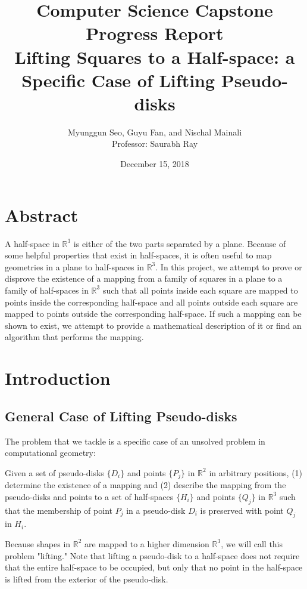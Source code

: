 \documentclass{NSF}
\begin{document}
\author{Myunggun Seo,  Guyu Fan, and Nischal Mainali \\ Professor: Saurabh Ray}
\date{December 15, 2018}
\title{
  {\normalfont Computer Science Capstone Progress Report} \\ 
  Lifting Squares to a Half-space: a Specific Case of Lifting Pseudo-disks
}
{\let\newpage\relax\maketitle}

\section{Abstract}
A half-space in $\mathbb{R}^3$ is either of the two parts separated by a plane. Because of some helpful properties that exist in half-spaces, it is often useful to map geometries in a plane to half-spaces in  $\mathbb{R}^3$. In this project, we attempt to prove or disprove the existence of a mapping from a family of squares in a plane to a family of half-spaces in $\mathbb{R}^3$ such that all points inside each square are mapped to points inside the corresponding half-space and all points outside each square are mapped to points outside the corresponding half-space. If such a mapping can be shown to exist, we attempt to provide a mathematical description of it or find an algorithm that performs the mapping.
\tableofcontents

\section{Introduction}
\subsection{General Case of Lifting Pseudo-disks}
The problem that we tackle is a specific case of an unsolved problem in computational geometry: 

Given a set of pseudo-disks $\{D_i\}$ and points $\{P_j\}$ in $\mathbb{R}^2$ in arbitrary positions, (1) determine the existence of a mapping and (2) describe the mapping from the pseudo-disks and points to a set of half-spaces $\{H_i\}$ and points $\{Q_j\}$ in $\mathbb{R}^3$ such that the membership of point $P_j$ in a pseudo-disk $D_i$ is preserved with point $Q_j$ in $H_i$. 

Because shapes in $\mathbb{R}^2$ are mapped to a higher dimension $\mathbb{R}^3$, we will call this problem "lifting." Note that lifting a pseudo-disk to a half-space does not require that the entire half-space to be occupied, but only that no point in the half-space is lifted from the exterior of the pseudo-disk.
\end{document}
